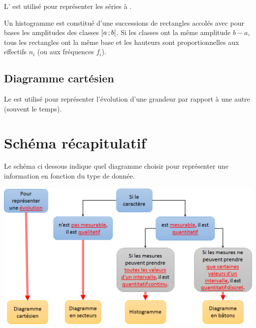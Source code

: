 \documentclass[12pt,a4paper]{article}
\begin{document}
\begin{mybox}
	L' est utilisé pour représenter les séries à .
	
	Un histogramme est constitué d'une successions de rectangles accolés avec pour bases les amplitudes des classes $\mbox{\ensuremath{\left[a\mathpunct{};b\right[}}$.
	Si les classes ont la même amplitude $b - a$, tous les rectangles ont la même base et les hauteurs sont proportionnelles aux effectifs $n_i$ (ou aux fréquences $f_i$).
\end{mybox}	



\subsection{Diagramme cartésien}

\begin{mybox}
	Le  est utilisé pour représenter l'évolution d'une grandeur par rapport à une autre (souvent le temps). 
\end{mybox}
	


\section{Schéma récapitulatif}

\vspace*{1cm}

Le schéma ci dessous indique quel diagramme choisir pour représenter une information en fonction du type de donnée. 

\begin{center}
	\includegraphics[scale=0.78]{img/bilan}
\end{center}
\end{document}
